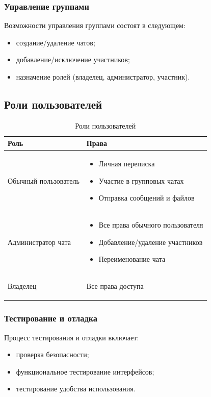 \subsubsection{Управление группами}  
Возможности управления группами состоят в следующем:  
\begin{itemize}  
	\item создание/удаление чатов;  
	\item добавление/исключение участников;  
	\item назначение ролей (владелец, администратор, участник).  
\end{itemize}  

\subsection{Роли пользователей}

\begin{xltabular}{\textwidth}{|l|X|}
	\caption{Роли пользователей}\label{tab:roles} \\ \hline
	\centrow Роль & \centrow Права \\ \hline
	\endfirsthead
	Обычный пользователь & 
	\begin{itemize}
		\item Личная переписка
		\item Участие в групповых чатах
		\item Отправка сообщений и файлов
	\end{itemize} \\ \hline
	Администратор чата & 
	\begin{itemize}
		\item Все права обычного пользователя
		\item Добавление/удаление участников
		\item Переименование чата
	\end{itemize} \\ \hline
	Владелец &
	\begin{itemize}
		Все права доступа
	\end{itemize} \\ \hline
\end{xltabular}

\subsubsection{Тестирование и отладка}  
Процесс тестирования и отладки включает:  
\begin{itemize}  
	\item проверка безопасности;  
	\item функциональное тестирование интерфейсов;  
	\item тестирование удобства использования.  
\end{itemize}  

